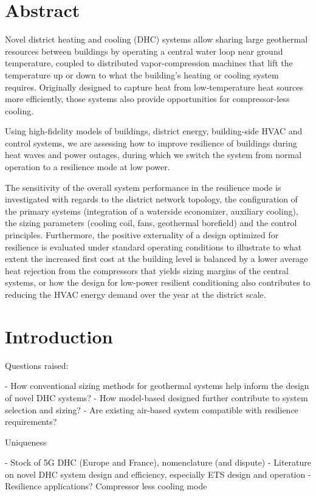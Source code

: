 \section{Abstract} \label{sec:abstract}

Novel district heating and cooling (DHC) systems allow sharing large geothermal resources between buildings by operating a central water loop near ground temperature, coupled to distributed vapor-compression machines that lift the temperature up or down to what the building’s heating or cooling system requires.
Originally designed to capture heat from low-temperature heat sources more efficiently, those systems also provide opportunities for compressor-less cooling.

Using high-fidelity models of buildings, district energy, building-side HVAC and control systems, we are assessing how to improve resilience of buildings during heat waves and power outages, during which we switch the system from normal operation to a resilience mode at low power.

The sensitivity of the overall system performance in the resilience mode is investigated with regards to the district network topology, the configuration of the primary systems (integration of a waterside economizer, auxiliary cooling), the sizing parameters (cooling coil, fans, geothermal borefield) and the control principles.
Furthermore, the positive externality of a design optimized for resilience is evaluated under standard operating conditions to illustrate to what extent the increased first cost at the building level is balanced by a lower average heat rejection from the compressors that yields sizing margins of the central systems, or how the design for low-power resilient conditioning also contributes to reducing the HVAC energy demand over the year at the district scale.


\section{Introduction} \label{sec:introduction}


Questions raised:

- How conventional sizing methods for geothermal systems help inform the design of novel DHC systems?
- How model-based designed further contribute to system selection and sizing?
- Are existing air-based system compatible with resilience requirements?

Uniqueness

- Stock of 5G DHC (Europe and France), nomenclature (and dispute)
- Literature on novel DHC system design and efficiency, especially ETS design and operation
- Resilience applications? Compressor less cooling mode

